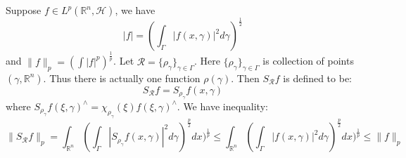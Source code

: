 \documentclass{report}
\theoremstyle{definition}
\theoremstyle{definition}
\theoremstyle{plain}
\numberwithin{theorem}{section}
\numberwithin{remark}{section}
\numberwithin{equation}{section}
\newcommand{\norm}[1]{\lVert#1\rVert}
\newcommand{\abs}[1]{\left\lvert#1\right\rvert}
\begin{document}
Suppose $f\in L^p(\mathbb{R}^n,\mathscr{H})$, we have
\begin{equation*}
    \abs{f}=(\int_{\Gamma}\abs{f(x,\gamma)}^2d\gamma)^\frac{1}{2}
\end{equation*}
and $\norm{f}_p=(\int\abs{f}^p)^\frac{1}{p}$.
Let $\mathscr{R}=\{\rho_\gamma\}_{\gamma\in \Gamma}$. Here $\{\rho_\gamma\}_{\gamma\in \Gamma}$ is collection of points $(\gamma,\mathbb{R}^n)$. Thus there is actually one function $\rho(\gamma)$. Then $S_{\mathscr{R}}f$ is defined to be:
\begin{equation*}
    S_{\mathscr{R}}f=S_{\rho_\gamma}f(x,\gamma)
\end{equation*}
where $S_{\rho_\gamma}f(\xi,\gamma)^\wedge=\chi_{\rho_\gamma}(\xi)f(\xi,\gamma)^\wedge$. We have inequality:
\begin{equation*}
    \norm{S_{\mathscr{R}}f}_p=\int_{\mathbb{R}^n}(\int_{\Gamma}\abs{S_{\rho_\gamma}f(x,\gamma)}^2d\gamma)^\frac{p}{2}dx)^\frac{1}{p}\leq\int_{\mathbb{R}^n}(\int_{\Gamma}\abs{f(x,\gamma)}^2d\gamma)^\frac{p}{2}dx)^\frac{1}{p}\leq \norm{f}_p
\end{equation*}
\end{document}
